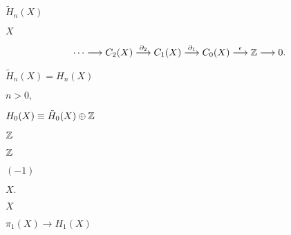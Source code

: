 \documentclass[10pt]{book}
\begin{document}
\begin{mdSnippets}
\begin{mdInlineSnippet}[265a73054d77b3d99fcab570fd7e6a28]
$\tilde{H}_n(X)$\end{mdInlineSnippet}%
\begin{mdInlineSnippet}[02129bb861061d1a052c592e2dc6b383]%
$X$\end{mdInlineSnippet}%
\begin{mdDisplaySnippet}[94f14b54d4e6b3245210434f7e31868c]%
\[%
\cdots \longrightarrow C_2(X)
\overset{\partial_2}{\longrightarrow} C_1(X)
\overset{\partial_1}{\longrightarrow} C_0(X)
\overset{\epsilon}{\longrightarrow} \Z
\longrightarrow 0.
\]%
\end{mdDisplaySnippet}%
\begin{mdInlineSnippet}[c015c8e1c0f723e8deb3636475453b91]%
$\tilde{H}_n(X) = H_n(X)$\end{mdInlineSnippet}%
\begin{mdInlineSnippet}[f31544eb08d1defae48d137df396be67]%
$n > 0,$\end{mdInlineSnippet}%
\begin{mdInlineSnippet}%
$H_0(X) \equiv \tilde{H}_0(X) \oplus \mathbb{Z}$\end{mdInlineSnippet}%
\begin{mdInlineSnippet}[1458a437b3c6456f9ebf61d46c9ed13e]%
$\mathbb{Z}$\end{mdInlineSnippet}%
\begin{mdInlineSnippet}[1458a437b3c6456f9ebf61d46c9ed13e]%
$\mathbb{Z}$\end{mdInlineSnippet}%
\begin{mdInlineSnippet}[7d6774ade191488268831fe319436d4f]%
$(-1)$\end{mdInlineSnippet}%
\begin{mdInlineSnippet}[3d2f9e254afe4be361f104d3748e8570]%
$X.$\end{mdInlineSnippet}%
\begin{mdInlineSnippet}[02129bb861061d1a052c592e2dc6b383]%
$X$\end{mdInlineSnippet}%
\begin{mdInlineSnippet}[a89489085c7d72443798f56d8a96286d]%
$\pi_1(X) \to H_1(X)$\end{mdInlineSnippet}%
\begin{mdInlineSnippet}%

\end{mdInlineSnippet}
\end{mdSnippets}
\end{document}
